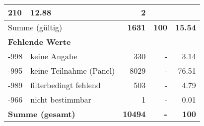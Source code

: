 \begin{longtable}{lXrrr}
       \num{210} &
       \num[round-mode=places,round-precision=2]{12.88} &
         \num[round-mode=places,round-precision=2]{2} \\
     \midrule
     \multicolumn{2}{l}{Summe (gültig)} &
       \textbf{\num{1631}} &
     \textbf{\num{100}} &
       \textbf{\num[round-mode=places,round-precision=2]{15.54}} \\
     \multicolumn{5}{l}{\textbf{Fehlende Werte}}\\
       -998 &
       keine Angabe &
         \num{330} &
        - &
         \num[round-mode=places,round-precision=2]{3.14} \\
       -995 &
       keine Teilnahme (Panel) &
         \num{8029} &
        - &
         \num[round-mode=places,round-precision=2]{76.51} \\
       -989 &
       filterbedingt fehlend &
         \num{503} &
        - &
         \num[round-mode=places,round-precision=2]{4.79} \\
       -966 &
       nicht bestimmbar &
         \num{1} &
        - &
         \num[round-mode=places,round-precision=2]{0.01} \\
     \midrule
     \multicolumn{2}{l}{\textbf{Summe (gesamt)}} &
          \textbf{\num{10494}} &
        \textbf{-} &
        \textbf{\num{100}} \\
     \bottomrule
     \end{longtable}
     
